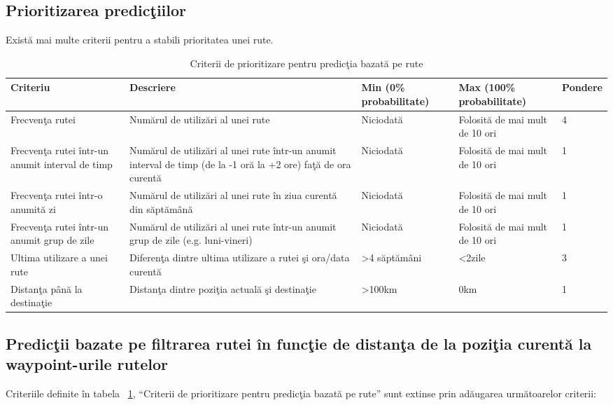 		\subsection{Prioritizarea predicţiilor}
		Există mai multe criterii pentru a stabili prioritatea unei rute. 
		
		\begin{table}[!h]
		\caption{Criterii de prioritizare pentru predicţia bazată pe rute}
		\centering
		\begin{tabular}{ | m{} | m{} | m{3,22cm} | m{} | m{} | }
		\hline
		\textbf{Criteriu} & \textbf{Descriere} & \textbf{Min (0\% probabilitate)} & \textbf{Max (100\% probabilitate)} & \textbf{Pondere} \\ 
		\hline
		 Frecvenţa rutei & Numărul de utilizări al unei rute & Niciodată & Folosită de mai mult de 10 ori & 4 \\
		\hline
		 Frecvenţa rutei într-un anumit interval de timp & Numărul de utilizări al unei rute într-un anumit interval de timp (de la -1 oră la +2 ore) faţă de ora curentă & Niciodată & Folosită de mai mult de 10 ori & 1 \\
		\hline
		 Frecvenţa rutei într-o anumită zi & Numărul de utilizări al unei rute în ziua curentă din săptămână & Niciodată & Folosită de mai mult de 10 ori & 1 \\
		\hline
		 Frecvenţa rutei într-un anumit grup de zile & Numărul de utilizări al unei rute într-un anumit grup de zile (e.g. luni-vineri)& Niciodată &  Folosită de mai mult de 10 ori  & 1 \\
		\hline
		 Ultima utilizare a unei rute & Diferenţa dintre ultima utilizare a rutei şi ora/data curentă & >4 săptămâni & <2zile & 3 \\
		\hline
		 Distanţa până la destinaţie & Distanţa dintre poziţia actuală şi destinaţie & >100km & 0km & 1 \\
		\hline
		\end{tabular}
		\label{table:tabel_predictii}
		\end{table}
		
		
		\subsection{Predicţii bazate pe filtrarea rutei în funcţie de distanţa de la poziţia curentă la waypoint-urile rutelor}
		Criteriile definite în tabela ~\ref{table:tabel_predictii}, ``Criterii de prioritizare pentru predicţia bazată pe rute'' sunt extinse prin adăugarea următoarelor criterii:
		
